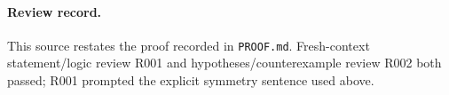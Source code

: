 \documentclass[11pt]{article}
\begin{document}
\paragraph{Review record.}
This source restates the proof recorded in \texttt{PROOF.md}. Fresh-context
statement/logic review R001 and hypotheses/counterexample review R002 both
passed; R001 prompted the explicit symmetry sentence used above.
\end{document}
